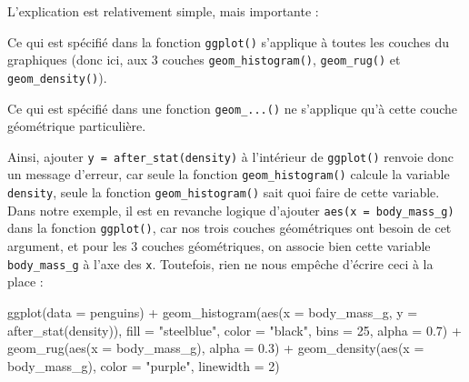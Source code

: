\documentclass[
  a4paper,
  DIV=11,
  numbers=noendperiod,
  oneside]{scrreprt}
\newenvironment{Shaded}{}{}
\newcommand{\AttributeTok}[1]{\textcolor[rgb]{0.84,0.23,0.29}{#1}}
\newcommand{\DecValTok}[1]{\textcolor[rgb]{0.00,0.36,0.77}{#1}}
\newcommand{\FloatTok}[1]{\textcolor[rgb]{0.00,0.36,0.77}{#1}}
\newcommand{\FunctionTok}[1]{\textcolor[rgb]{0.44,0.26,0.76}{#1}}
\newcommand{\NormalTok}[1]{\textcolor[rgb]{0.14,0.16,0.18}{#1}}
\newcommand{\SpecialCharTok}[1]{\textcolor[rgb]{0.00,0.36,0.77}{#1}}
\newcommand{\StringTok}[1]{\textcolor[rgb]{0.01,0.18,0.38}{#1}}
\begin{document}
L'explication est relativement simple, mais importante :

\begin{tcolorbox}[enhanced jigsaw, coltitle=black, toprule=.15mm, opacityback=0, breakable, colback=white, opacitybacktitle=0.6, colframe=quarto-callout-important-color-frame, leftrule=.75mm, rightrule=.15mm, titlerule=0mm, bottomtitle=1mm, toptitle=1mm, arc=.35mm, title=\textcolor{quarto-callout-important-color}{\faExclamation}\hspace{0.5em}{Important}, colbacktitle=quarto-callout-important-color!10!white, bottomrule=.15mm, left=2mm]

Ce qui est spécifié dans la fonction \texttt{ggplot()} s'applique à
toutes les couches du graphiques (donc ici, aux 3 couches
\texttt{geom\_histogram()}, \texttt{geom\_rug()} et
\texttt{geom\_density()}).

Ce qui est spécifié dans une fonction \texttt{geom\_...()} ne s'applique
qu'à cette couche géométrique particulière.

\end{tcolorbox}

Ainsi, ajouter \texttt{y\ =\ after\_stat(density)} à l'intérieur de
\texttt{ggplot()} renvoie donc un message d'erreur, car seule la
fonction \texttt{geom\_histogram()} calcule la variable
\texttt{density}, seule la fonction \texttt{geom\_histogram()} sait quoi
faire de cette variable. Dans notre exemple, il est en revanche logique
d'ajouter \texttt{aes(x\ =\ body\_mass\_g)} dans la fonction
\texttt{ggplot()}, car nos trois couches géométriques ont besoin de cet
argument, et pour les 3 couches géométriques, on associe bien cette
variable \texttt{body\_mass\_g} à l'axe des \texttt{x}. Toutefois, rien
ne nous empêche d'écrire ceci à la place :

\begin{Shaded}
\begin{Highlighting}[]
\FunctionTok{ggplot}\NormalTok{(}\AttributeTok{data =}\NormalTok{ penguins) }\SpecialCharTok{+}
  \FunctionTok{geom\_histogram}\NormalTok{(}\FunctionTok{aes}\NormalTok{(}\AttributeTok{x =}\NormalTok{ body\_mass\_g, }\AttributeTok{y =} \FunctionTok{after\_stat}\NormalTok{(density)),}
                 \AttributeTok{fill =} \StringTok{"steelblue"}\NormalTok{, }\AttributeTok{color =} \StringTok{"black"}\NormalTok{,}
                 \AttributeTok{bins =} \DecValTok{25}\NormalTok{, }\AttributeTok{alpha =} \FloatTok{0.7}\NormalTok{) }\SpecialCharTok{+}
  \FunctionTok{geom\_rug}\NormalTok{(}\FunctionTok{aes}\NormalTok{(}\AttributeTok{x =}\NormalTok{ body\_mass\_g),}
           \AttributeTok{alpha =} \FloatTok{0.3}\NormalTok{) }\SpecialCharTok{+}
  \FunctionTok{geom\_density}\NormalTok{(}\FunctionTok{aes}\NormalTok{(}\AttributeTok{x =}\NormalTok{ body\_mass\_g),}
               \AttributeTok{color =} \StringTok{"purple"}\NormalTok{, }\AttributeTok{linewidth =} \DecValTok{2}\NormalTok{)}
\end{Highlighting}
\end{Shaded}
\end{document}

